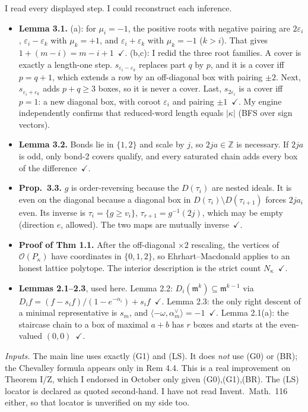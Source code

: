 \documentclass[11pt]{article}
\begin{document}
I read every displayed step. I could reconstruct each inference.

\begin{itemize}[leftmargin=*]
\item \textbf{Lemma 3.1.} (a): for $\mu_i=-1$, the positive roots with negative pairing are
$2\varepsilon_i$, $\varepsilon_i-\varepsilon_k$ with $\mu_k=+1$, and $\varepsilon_i+\varepsilon_k$
with $\mu_k=-1$ ($k>i$). That gives $1+(m-i)=m-i+1$~$\checkmark$. (b,c): I redid the three root families. A
cover is exactly a length-one step. $s_{\varepsilon_i-\varepsilon_k}$ replaces part $q$ by $p$, and
it is a cover iff $p=q+1$, which extends a row by an off-diagonal box with pairing $\pm2$. Next,
$s_{\varepsilon_i+\varepsilon_k}$ adds $p+q\ge3$ boxes, so it is never a cover. Last,
$s_{2\varepsilon_i}$ is a cover iff $p=1$: a new diagonal box, with coroot $\varepsilon_i$ and
pairing $\pm1$~$\checkmark$. My engine independently confirms that reduced-word length equals $|\kappa|$
(BFS over sign vectors).
\item \textbf{Lemma 3.2.} Bonds lie in $\{1,2\}$ and scale by $j$, so $2ja\in\mathbb Z$ is
necessary. If $2ja$ is odd, only bond-2 covers qualify, and every saturated chain adds every box
of the difference~$\checkmark$.
\item \textbf{Prop.~3.3.} $g$ is order-reversing because the $D(\tau_i)$ are nested ideals. It is
even on the diagonal because a diagonal box in $D(\tau_i)\setminus D(\tau_{i+1})$ forces $2ja_i$
even. Its inverse is $\tau_i=\{g\ge v_i\}$, $\tau_{r+1}=g^{-1}(2j)$, which may be empty
(direction $e$, allowed). The two maps are mutually inverse~$\checkmark$.
\item \textbf{Proof of Thm 1.1.} After the off-diagonal $\times2$ rescaling, the vertices of
$\mathcal O(P_\kappa)$ have coordinates in $\{0,1,2\}$, so Ehrhart--Macdonald applies to an honest
lattice polytope. The interior description is the strict count $N_\kappa$~$\checkmark$.
\item \textbf{Lemmas 2.1--2.3}, used here. Lemma 2.2: $D_i(\mathfrak m^k)\subseteq\mathfrak m^{k-1}$
via $D_if=(f-s_if)/(1-e^{-\alpha_i})+s_if$~$\checkmark$. Lemma 2.3: the only right descent of a minimal
representative is $s_m$, and $\langle-\omega,\alpha_m^\vee\rangle=-1$~$\checkmark$. Lemma 2.1(a): the
staircase chain to a box of maximal $a+b$ has $r$ boxes and starts at the even-valued $(0,0)$~$\checkmark$.
\end{itemize}
\emph{Inputs.} The main line uses exactly (G1) and (LS). It does \emph{not} use (G0) or (BR); the
Chevalley formula appears only in Rem 4.4. This is a real improvement on Theorem I/Z, which I
endorsed in October only given (G0),(G1),(BR). The (LS) locator \cite[\S5.2]{Lit94} is declared as
quoted second-hand. I have not read Invent.\ Math.\ 116 either, so that locator is unverified on my
side too.
\end{document}
